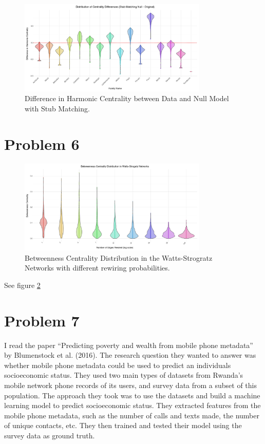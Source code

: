 \documentclass[12pt]{article}
\begin{document}
\begin{figure}[h]
    \centering
    \includegraphics[width=0.8\textwidth]{../figures/centrality_differences_stub_matching.png}
    \caption{Difference in Harmonic Centrality between Data and Null Model with Stub Matching.}
    \label{fig:harmonic_centrality_differences_stub_matching}
\end{figure}

\section*{Problem 6}

\begin{figure}[h]
    \centering
    \includegraphics[width=0.8\textwidth]{../figures/betweenness_distribution.png}
    \caption{Betweenness Centrality Distribution in the Watts-Strogratz Networks with different rewiring probabilities.}
    \label{fig:betweenness_distribution}
\end{figure}

See figure \ref{fig:betweenness_distribution}

\section*{Problem 7}

I read the paper ``Predicting poverty and wealth from mobile phone metadata'' by Blumenstock et al. (2016).  The research question they wanted to answer was whether mobile phone metadata could be used to predict an individuals socioeconomic status. They used two main types of datasets from Rwanda's mobile network phone records of its users, and survey data from a subset of this population. The approach they took was to use the datasets and build a machine learning model to predict socioeconomic status. They extracted features from the mobile phone metadata, such as the number of calls and texts made, the number of unique contacts, etc. They then trained and tested their model using the survey data as ground truth.
\end{document}
